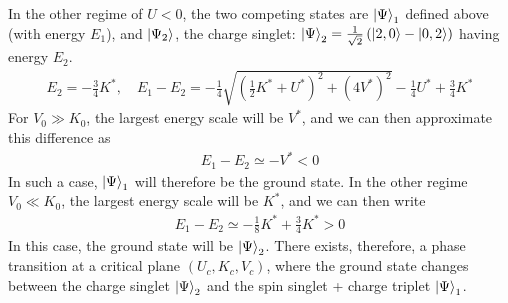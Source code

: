\documentclass{report}
\numberwithin{equation}{section}
\begin{document}
In the other regime of \(U<0\), the two competing states are \(\ket{\Psi}_1\) defined above (with energy \(E_1\)), and \(\ket{\Psi_2}\), the charge singlet: \(\ket{\Psi}_2 = \frac{1}{\sqrt 2}\left( \ket{2,0} - \ket{0,2} \right)\) having energy \(E_2\).
\begin{equation}\begin{aligned}
	E_2 = -\frac{3}{4}K^*, \quad E_1 - E_2 = -\frac{1}{4}\sqrt{\left( \frac{1}{2}K^* + U^* \right)^2 + (4V^*)^2} - \frac{1}{4}U^* + \frac{3}{4}K^*
\end{aligned}\end{equation}
For \(V_0 \gg K_0\), the largest energy scale will be \(V^*\), and we can then approximate this difference as
\begin{equation}\begin{aligned}
	E_1 - E_2 \simeq -V^* < 0
\end{aligned}\end{equation}
In such a case, \(\ket{\Psi}_1\) will therefore be the ground state. In the other regime \(V_0 \ll K_0\), the largest energy scale will be \(K^*\), and we can then write
\begin{equation}\begin{aligned}
	E_1 - E_2 \simeq - \frac{1}{8}K^* + \frac{3}{4}K^* > 0
\end{aligned}\end{equation}
In this case, the ground state will be \(\ket{\Psi}_2\). There exists, therefore, a phase transition at a critical plane \((U_c, K_c, V_c)\), where the ground state changes between the charge singlet \(\ket{\Psi}_2\) and the spin singlet + charge triplet \(\ket{\Psi}_1\).
\end{document}

